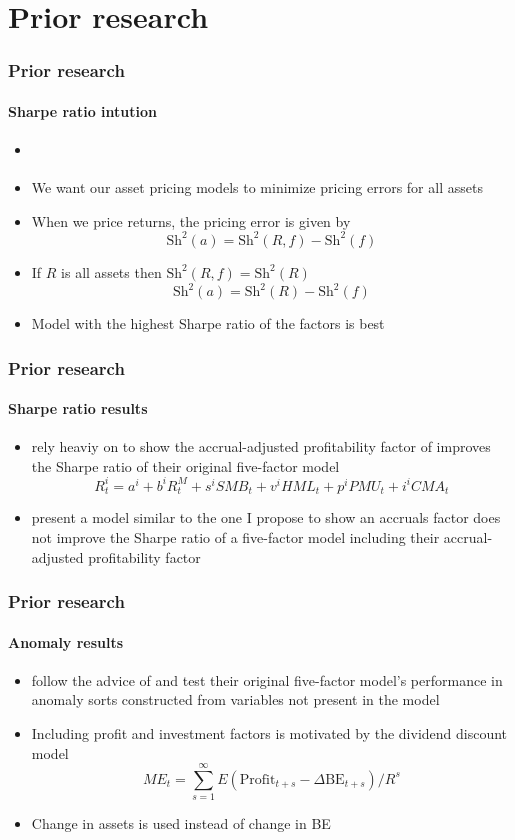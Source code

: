 \documentclass[notes]{beamer}  %
\begin{document}
\section{Prior research}

\begin{frame} \frametitle{Prior research} \framesubtitle{Sharpe ratio intution}
\begin{itemize}
    \item \textcite{barillas2016alpha}
    \item We want our asset pricing models to minimize pricing errors for
    all assets
    \item When we price returns, the pricing error is given by
    \[
    \text{Sh}^2(a) = \text{Sh}^2(R, f) - \text{Sh}^2(f)
    \]
    \item If $R$ is all assets then $\text{Sh}^2(R, f) = \text{Sh}^2(R)$
    \[
    \text{Sh}^2(a) = \text{Sh}^2(R) - \text{Sh}^2(f)
    \]
    \item Model with the highest Sharpe ratio of the factors is best
\end{itemize}
\end{frame}

\begin{frame} \frametitle{Prior research} \framesubtitle{Sharpe ratio results}
  \begin{itemize}
    \item \textcite{fama2016choosing} rely heaviy on
    \textcite{barillas2016alpha} to show the accrual-adjusted profitability
    factor of \textcite{ball2016accruals} improves the Sharpe ratio of their
    original five-factor model \parencite{fama2015five}
    \begin{equation}
      R_t^i=a^i + b^iR_t^M + s^iSMB_t + v^iHML_t + p^iPMU_t + i^iCMA_t
    \end{equation}
    \item \textcite{ball2016accruals} present a model similar to the one I
    propose to show an accruals factor does not improve the Sharpe ratio of a
    five-factor model including their accrual-adjusted profitability factor
  \end{itemize}
\end{frame}

\begin{frame} \frametitle{Prior research} \framesubtitle{Anomaly results}
  \begin{itemize}
    \item \textcite{fama2016dissecting} follow the advice of
    \textcite{lewellen2010skeptical} and test their original five-factor
    model's performance in anomaly sorts constructed from variables not present
    in the model
    \item Including profit and investment factors is motivated by the dividend
    discount model \parencite{fama2006profitability}
    \[ME_t =
    \sum_{s=1}^\infty E\left( \text{Profit}_{t+s}-
    \Delta\text{BE}_{t+s}\right) /R^s\]
    \item Change in assets is used instead of change in BE
  \end{itemize}
\end{frame}
\end{document}
